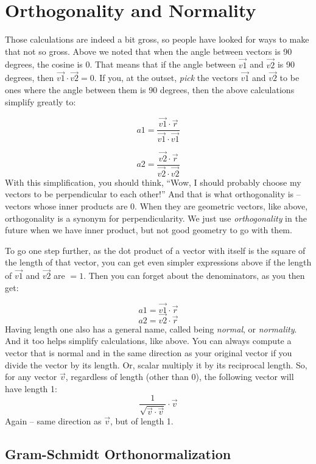 \documentclass[
]{book}
\begin{document}
\hypertarget{orthogonality-and-normality}{%
\section{Orthogonality and Normality}\label{orthogonality-and-normality}}

Those calculations are indeed a bit gross, so people have looked for ways to make that not so gross. Above we noted that when the angle between vectors is 90 degrees, the cosine is 0. That means that if the angle between \(\vec{v1}\) and \(\vec{v2}\) is 90 degrees, then \(\vec{v1}\cdot\vec{v2} = 0\). If you, at the outset, \emph{pick} the vectors \(\vec{v1}\) and \(\vec{v2}\) to be ones where the angle between them is 90 degrees, then the above calculations simplify greatly to:

\[a1 = \frac{\vec{v1}\cdot\vec{r}}{\vec{v1}\cdot\vec{v1}}\]

\[a2 = \frac{\vec{v2}\cdot\vec{r}}{\vec{v2}\cdot\vec{v2}}\]
With this simplification, you should think, ``Wow, I should probably choose my vectors to be perpendicular to each other!'' And that is what orthogonality is -- vectors whose inner products are 0. When they are geometric vectors, like above, orthogonality is a synonym for perpendicularity. We just use \emph{orthogonality} in the future when we have inner product, but not good geometry to go with them.

To go one step further, as the dot product of a vector with itself is the square of the length of that vector, you can get even simpler expressions above if the length of \(\vec{v1}\) and \(\vec{v2}\) are \(= 1\). Then you can forget about the denominators, as you then get:

\[a1 = \vec{v1}\cdot\vec{r}\]
\[a2 = \vec{v2}\cdot\vec{r}\]
Having length one also has a general name, called being \emph{normal}, or \emph{normality}. And it too helps simplify calculations, like above. You can always compute a vector that is normal and in the same direction as your original vector if you divide the vector by its length. Or, scalar multiply it by its reciprocal length. So, for any vector \(\vec{v}\), regardless of length (other than 0), the following vector will have length 1:
\[\frac{1}{\sqrt{\vec{v}\cdot\vec{v}}}\cdot\vec{v}\]
Again -- same direction as \(\vec{v}\), but of length 1.

\hypertarget{gram-schmidt-orthonormalization}{%
\subsection{Gram-Schmidt Orthonormalization}\label{gram-schmidt-orthonormalization}}
\end{document}
